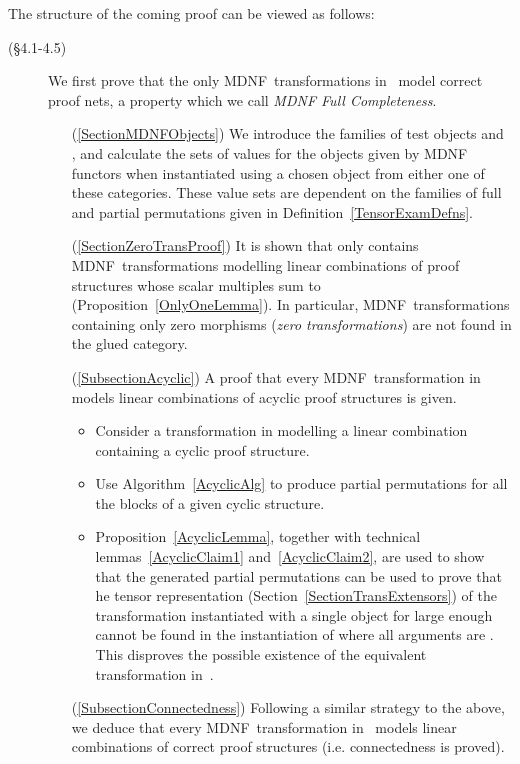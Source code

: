 \documentclass{LMCS}
\theoremstyle{plain}\newtheorem*{cLm}{Claim}
\newcommand{\hughh}[1]{#1}
\begin{document}
\hughh{The structure of the coming proof can be viewed as follows:}
\begin{description}
\item[\rm(\S 4.1-4.5)] We first prove that the only MDNF~transformations in~ model correct proof nets, a property which we call \emph{MDNF Full Completeness}. 
	\begin{enumerate}[label=(\autoref{SectionZeroTransProof})]
	\item[(\autoref{SectionMDNFObjects})] We introduce the families of test objects  and , and calculate the sets of values for the objects given by MDNF functors when instantiated using a chosen object from either one of these categories. These value sets are dependent on the families of full and partial permutations given in Definition~\ref{TensorExamDefns}.
	\item[(\autoref{SectionZeroTransProof})] It is shown that  only contains MDNF~transformations modelling linear combinations of proof structures whose scalar multiples sum to  (Proposition~\ref{OnlyOneLemma}). In particular, MDNF~transformations containing only zero morphisms (\emph{zero transformations}) are not found in the glued category.
	\item[(\autoref{SubsectionAcyclic})] A proof that every MDNF~transformation in~ models linear combinations of acyclic proof structures is given.
		\begin{itemize}
		\item Consider a transformation  in  modelling a linear combination containing a cyclic proof structure.
		\item Use Algorithm~\ref{AcyclicAlg} to produce partial permutations for all the blocks of a given cyclic structure.
		\item Proposition~\ref{AcyclicLemma}, together with technical lemmas~\ref{AcyclicClaim1} and~\ref{AcyclicClaim2}, are used to show that the generated partial permutations can be used to prove that  he tensor representation (Section~\ref{SectionTransExtensors}) of the transformation instantiated with a single object  for large enough  cannot be found in the instantiation of  where all arguments are . This disproves the possible existence of the equivalent transformation in~.
		\end{itemize}
	\item[(\autoref{SubsectionConnectedness})] Following a similar strategy to the above, we deduce that every MDNF~transformation in~ models linear combinations of correct proof structures (i.e. connectedness is proved).
		\begin{itemize}

\end{itemize}
\end{enumerate}
\end{description}
\end{document}

